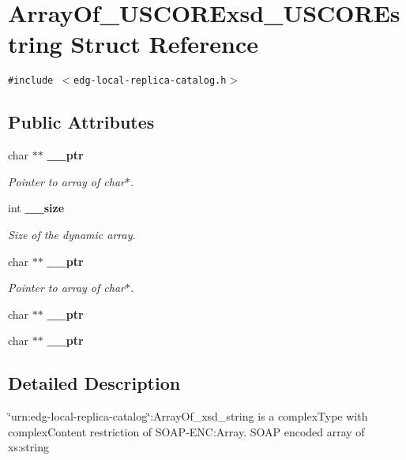 \section{Array\-Of\_\-USCORExsd\_\-USCOREstring Struct Reference}
\label{structArrayOf__USCORExsd__USCOREstring}
{\tt \#include $<$edg-local-replica-catalog.h$>$}

\subsection*{Public Attributes}
\begin{CompactItemize}
\item 
char $\ast$$\ast$ \bf{\_\-\_\-ptr}\label{structArrayOf__USCORExsd__USCOREstring_f36432abc67a9c5b84e7a34c98921f4c}

\begin{CompactList}\small\item\em Pointer to array of char$\ast$. \item\end{CompactList}\item 
int \bf{\_\-\_\-size}\label{structArrayOf__USCORExsd__USCOREstring_776cd355f1d6771e968dfef0ab8378fe}

\begin{CompactList}\small\item\em Size of the dynamic array. \item\end{CompactList}\item 
char $\ast$$\ast$ \bf{\_\-\_\-ptr}\label{structArrayOf__USCORExsd__USCOREstring_f36432abc67a9c5b84e7a34c98921f4c}

\begin{CompactList}\small\item\em Pointer to array of char$\ast$. \item\end{CompactList}\item 
char $\ast$$\ast$ \textbf{\_\-\_\-ptr}\label{structArrayOf__USCORExsd__USCOREstring_29acf7319dbf8762371a888d3893408f}

\item 
char $\ast$$\ast$ \textbf{\_\-\_\-ptr}\label{structArrayOf__USCORExsd__USCOREstring_29acf7319dbf8762371a888d3893408f}

\end{CompactItemize}


\subsection{Detailed Description}
\char`\"{}urn:edg-local-replica-catalog\char`\"{}:Array\-Of\_\-xsd\_\-string is a complex\-Type with complex\-Content restriction of SOAP-ENC:Array. SOAP encoded array of xs:string 




